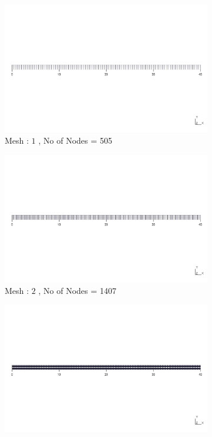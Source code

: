\documentclass[9pt]{beamer}
\begin{document}
\begin{frame}


\begin{figure}[h!]
\centering
\begin{subfigure}{1\textwidth}
\includegraphics[width=\linewidth,trim={0.2cm 11cm 0.2cm 11cm},clip]{Mesh_Dependency/meshes/1.png}
\caption{Mesh : $1$ , No of Nodes = 505 }
\end{subfigure} \vfill
\begin{subfigure}{1\textwidth}
\includegraphics[width=\linewidth,trim={0.2cm 11cm 0.2cm 11cm},clip]{Mesh_Dependency/meshes/2.png}
\caption{Mesh : $2$ , No of Nodes = 1407}
\end{subfigure}\vfill
\begin{subfigure}{1\textwidth}
\includegraphics[width=\linewidth,trim={0.2cm 11cm 0.2cm 11cm},clip]{Mesh_Dependency/meshes/3.png}

\end{subfigure}
\end{figure}
\end{frame}
\end{document}
